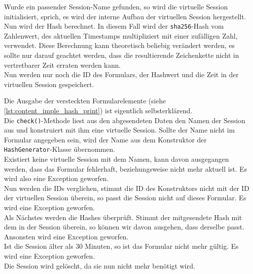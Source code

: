 Wurde ein passender Session-Name gefunden, so wird die virtuelle Session initialisiert, sprich, es wird der interne Aufbau der virtuellen Session hergestellt.\\
Nun wird der Hash berechnet. In diesem Fall wird der \texttt{sha256}-Hash vom Zahlenwert, des aktuellen Timestamps multipliziert mit einer zufälligen Zahl, verwendet. Diese Berechnung kann theoretisch beliebig verändert werden, es sollte nur darauf geachtet werden, dass die resultierende Zeichenkette nicht in vertretbarer Zeit erraten werden kann.\\
Nun werden nur noch die ID des Formulars, der Hashwert und die Zeit in der virtuellen Session gespeichert.

Die Ausgabe der versteckten Formularelemente (siehe \autoref{lst:content_imple_hash_print}) ist eigentlich selbsterklärend.\\

Die \texttt{check()}-Methode liest aus den abgesendeten Daten den Namen der Session aus und konstruiert mit ihm eine virtuelle Session. Sollte der Name nicht im Formular angegeben sein, wird der Name aus dem Konstruktor der \texttt{HashGenerator}-Klasse übernommen.\\
Existiert keine virtuelle Session mit dem Namen, kann davon ausgegangen werden, dass das Formular fehlerhaft, beziehungsweise nicht mehr aktuell ist. Es wird also eine Exception geworfen.\\
Nun werden die IDs verglichen, stimmt die ID des Konstruktors nicht mit der ID der virtuellen Session überein, so passt die Session nicht auf dieses Formular. Es wird eine Exception geworfen.\\
Als Nächstes werden die Hashes überprüft. Stimmt der mitgesendete Hash mit dem in der Session überein, so können wir davon ausgehen, dass derselbe passt. Ansonsten wird eine Exception geworfen.\\
Ist die Session älter als 30 Minuten, so ist das Formular nicht mehr gültig. Es wird eine Exception geworfen.\\
Die Session wird gelöscht, da sie nun nicht mehr benötigt wird.

